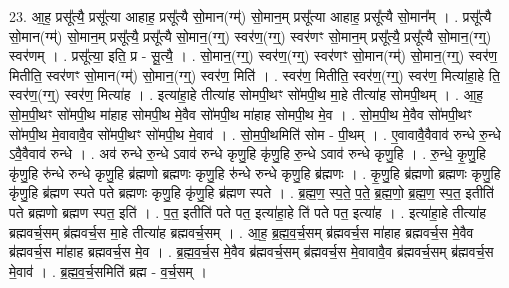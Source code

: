 \documentclass[17pt]{extarticle}
\begin{document}
23. आ॒ह॒ प्रसू᳚त्यै॒ प्रसू᳚त्या आहाह॒ प्रसू᳚त्यै सो॒मान(ग्म्॑) सो॒मान॒म् प्रसू᳚त्या आहाह॒ प्रसू᳚त्यै सो॒मान᳚म् । . प्रसू᳚त्यै सो॒मान(ग्म्॑) सो॒मान॒म् प्रसू᳚त्यै॒ प्रसू᳚त्यै सो॒मान॒(ग्ग्॒) स्वर॑ण॒(ग्ग्॒) स्वर॑णꣳ सो॒मान॒म् प्रसू᳚त्यै॒ प्रसू᳚त्यै सो॒मान॒(ग्ग्॒) स्वर॑णम् । . प्रसू᳚त्या॒ इति॒ प्र - सू॒त्यै॒ । . सो॒मान॒(ग्ग्॒) स्वर॑ण॒(ग्ग्॒) स्वर॑णꣳ सो॒मान(ग्म्॑) सो॒मान॒(ग्ग्॒) स्वर॑ण॒ मितीति॒ स्वर॑णꣳ सो॒मान(ग्म्॑) सो॒मान॒(ग्ग्॒) स्वर॑ण॒ मिति॑ । . स्वर॑ण॒ मितीति॒ स्वर॑ण॒(ग्ग्॒) स्वर॑ण॒ मित्या॑हा॒हे ति॒ स्वर॑ण॒(ग्ग्॒) स्वर॑ण॒ मित्या॑ह । . इत्या॑हा॒हे तीत्या॑ह सोमपी॒थꣳ सो॑मपी॒थ मा॒हे तीत्या॑ह सोमपी॒थम् । . आ॒ह॒ सो॒म॒पी॒थꣳ सो॑मपी॒थ मा॑हाह सोमपी॒थ मे॒वैव सो॑मपी॒थ मा॑हाह सोमपी॒थ मे॒व । . सो॒म॒पी॒थ मे॒वैव सो॑मपी॒थꣳ सो॑मपी॒थ मे॒वावावै॒व सो॑मपी॒थꣳ सो॑मपी॒थ मे॒वाव॑ । . सो॒म॒पी॒थमिति॑ सोम - पी॒थम् । . ए॒वावावै॒वैवाव॑ रुन्धे रु॒न्धे ऽवै॒वैवाव॑ रुन्धे । . अव॑ रुन्धे रु॒न्धे ऽवाव॑ रुन्धे कृणु॒हि कृ॑णु॒हि रु॒न्धे ऽवाव॑ रुन्धे कृणु॒हि । . रु॒न्धे॒ कृ॒णु॒हि कृ॑णु॒हि रु॑न्धे रुन्धे कृणु॒हि ब्र॑ह्मणो ब्रह्मणः कृणु॒हि रु॑न्धे रुन्धे कृणु॒हि ब्र॑ह्मणः । . कृ॒णु॒हि ब्र॑ह्मणो ब्रह्मणः कृणु॒हि कृ॑णु॒हि ब्र॑ह्मण स्पते पते ब्रह्मणः कृणु॒हि कृ॑णु॒हि ब्र॑ह्मण स्पते । . ब्र॒ह्म॒ण॒ स्प॒ते॒ प॒ते॒ ब्र॒ह्म॒णो॒ ब्र॒ह्म॒ण॒ स्प॒त॒ इतीति॑ पते ब्रह्मणो ब्रह्मण स्पत॒ इति॑ । . प॒त॒ इतीति॑ पते पत॒ इत्या॑हा॒हे ति॑ पते पत॒ इत्या॑ह । . इत्या॑हा॒हे तीत्या॑ह ब्रह्मवर्च॒सम् ब्र॑ह्मवर्च॒स मा॒हे तीत्या॑ह ब्रह्मवर्च॒सम् । . आ॒ह॒ ब्र॒ह्म॒व॒र्च॒सम् ब्र॑ह्मवर्च॒स मा॑हाह ब्रह्मवर्च॒स मे॒वैव ब्र॑ह्मवर्च॒स मा॑हाह ब्रह्मवर्च॒स मे॒व । . ब्र॒ह्म॒व॒र्च॒स मे॒वैव ब्र॑ह्मवर्च॒सम् ब्र॑ह्मवर्च॒स मे॒वावावै॒व ब्र॑ह्मवर्च॒सम् ब्र॑ह्मवर्च॒स मे॒वाव॑ । . ब्र॒ह्म॒व॒र्च॒समिति॑ ब्रह्म - व॒र्च॒सम् । \newline
\end{document}
